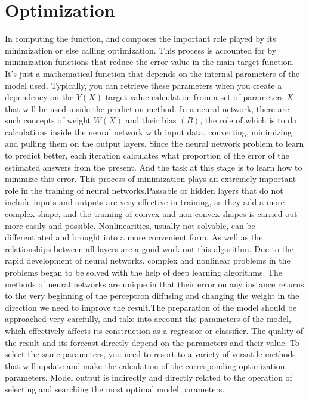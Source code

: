 \section{Optimization}\label{sec:3.6}
\vspace{-0.5cm}
\par
\noindent In computing the function, and composes the important role played by its minimization or else calling optimization. This process is accounted for by minimization functions that reduce the error value in the main target function. It's just a mathematical function that depends on the internal parameters of the model used. Typically, you can retrieve these parameters when you create a dependency on the $Y(X)$ target value calculation from a set of parameters $X$ that will be used inside the prediction method. In a neural network, there are such concepts of weight $W(X)$ and their bias $(B)$, the role of which is to do calculations inside the neural network with input data, converting, minimizing and pulling them on the output layers. Since the neural network problem to learn to predict better, each iteration calculates what proportion of the error of the estimated answers from the present. And the task at this stage is to learn how to minimize this error. This process of minimization plays an extremely important role in the training of neural networks.Passable or hidden layers that do not include inputs and outputs are very effective in training, as they add a more complex shape, and the training of convex and non-convex shapes is carried out more easily and possible. Nonlinearities, usually not solvable, can be differentiated and brought into a more convenient form. As well as the relationships between all layers are a good work out this algorithm. Due to the rapid development of neural networks, complex and nonlinear problems in the problems began to be solved with the help of deep learning algorithms. The methods of neural networks are unique in that their error on any instance returns to the very beginning of the perceptron diffusing and changing the weight in the direction we need to improve the result.The preparation of the model should be approached very carefully, and take into account the parameters of the model, which effectively affects its construction as a regressor or classifier. The quality of the result and its forecast directly depend on the parameters and their value. To select the same parameters, you need to resort to a variety of versatile methods that will update and make the calculation of the corresponding optimization parameters. Model output is indirectly and directly related to the operation of selecting and searching the most optimal model parameters.
